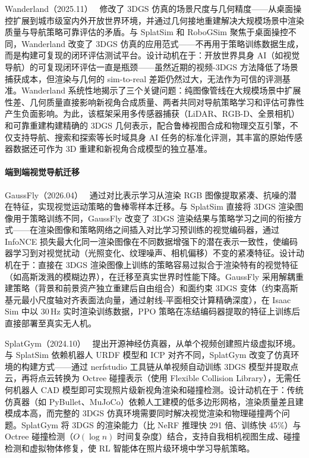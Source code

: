 Wanderland（2025.11）~\cite{2511_20620} 修改了 3DGS 仿真的场景尺度与几何精度——从桌面操控扩展到城市级室内外开放世界环境，并通过几何接地重建解决大规模场景中渲染质量与导航策略可靠评估的矛盾。与 SplatSim 和 RoboGSim 聚焦于桌面操控不同，Wanderland 改变了 3DGS 仿真的应用范式——不再用于策略训练数据生成，而是构建可复现的闭环评估测试平台。设计动机在于：开放世界具身 AI（如视觉导航）的可复现闭环评估一直是瓶颈——虽然近期的视频-3DGS 方法降低了场景捕获成本，但渲染与几何的 sim-to-real 差距仍然过大，无法作为可信的评测基准。Wanderland 系统性地揭示了三个关键问题：纯图像管线在大规模场景中扩展性差、几何质量直接影响新视角合成质量、两者共同对导航策略学习和评估可靠性产生负面影响。为此，该框架采用多传感器捕获（LiDAR、RGB-D、全景相机）和可靠重建构建精确的 3DGS 几何表示，配合鲁棒视图合成和物理交互引擎，不仅支持导航、搜索和探索等长时域具身 AI 任务的标准化评测，其丰富的原始传感器数据还可作为 3D 重建和新视角合成模型的独立基准。

\paragraph{端到端视觉导航迁移}

GaussFly（2026.04）~\cite{2604_05062} 通过对比表示学习从渲染 RGB 图像提取紧凑、抗噪的潜在特征，实现视觉运动策略的鲁棒零样本迁移。与 SplatSim 直接将 3DGS 渲染图像用于策略训练不同，GaussFly 改变了 3DGS 渲染结果与策略学习之间的衔接方式——在渲染图像和策略网络之间插入对比学习预训练的视觉编码器，通过 InfoNCE 损失最大化同一渲染图像在不同数据增强下的潜在表示一致性，使编码器学习到对视觉扰动（光照变化、纹理噪声、相机偏移）不变的紧凑特征。设计动机在于：直接在 3DGS 渲染图像上训练的策略容易过拟合于渲染特有的视觉特征（如高斯泼溅的模糊边界），在迁移至真实世界时性能下降。GaussFly 采用解耦重建策略（背景和前景资产独立重建后自由组合）和面约束 3DGS 变体（约束高斯基元最小尺度轴对齐表面法向量，通过射线-平面相交计算精确深度），在 Isaac Sim 中以 30\,Hz 实时渲染训练数据，PPO 策略在冻结编码器提取的特征上训练后直接部署至真实无人机。

SplatGym（2024.10）~\cite{2410_19564} 提出开源神经仿真器，从单个视频创建照片级虚拟环境。与 SplatSim 依赖机器人 URDF 模型和 ICP 对齐不同，SplatGym 改变了仿真环境的构建方式——通过 nerfstudio 工具链从单视频自动训练 3DGS 模型并提取点云，再将点云转换为 Octree 碰撞表示（使用 Flexible Collision Library），无需任何机器人 CAD 模型即可实现照片级新视角渲染和碰撞检测。设计动机在于：传统仿真器（如 PyBullet、MuJoCo）依赖人工建模的低多边形网格，渲染质量差且建模成本高，而完整的 3DGS 仿真环境需要同时解决视觉渲染和物理碰撞两个问题。SplatGym 将 3DGS 的渲染能力（比 NeRF 推理快 291 倍、训练快 45\%）与 Octree 碰撞检测（$O(\log n)$ 时间复杂度）结合，支持自我相机视图生成、碰撞检测和虚拟物体修复，使 RL 智能体在照片级环境中学习导航策略。

